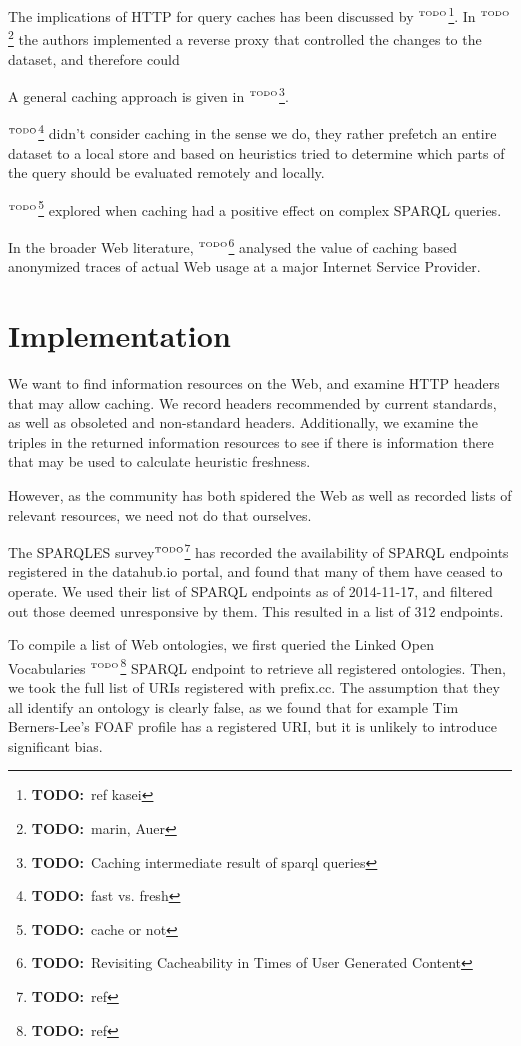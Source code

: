 \documentclass{article}
\newcommand{\todo}[1]{\ensuremath{^{\textrm{\tiny{TODO}\normalsize}}}\footnote{\textbf{TODO:}~#1}}
\begin{document}
The implications of HTTP for query caches has been discussed by
\todo{ref kasei}. In \todo{marin, Auer} the authors implemented a
reverse proxy that controlled the changes to the dataset, and
therefore could 

A general caching approach is given in \todo{Caching intermediate
  result of sparql queries}. 

\todo{fast vs. fresh} didn't consider caching in the sense we do, they
rather prefetch an entire dataset to a local store and based on
heuristics tried to determine which parts of the query should be
evaluated remotely and locally.

\todo{cache or not} explored when caching had a positive effect on
complex SPARQL queries.

In the broader Web literature, \todo{Revisiting Cacheability
in Times of User Generated Content} analysed the value of caching
based anonymized traces of actual Web usage at a major Internet
Service Provider.

\section{Implementation}

We want to find information resources on the Web, and examine HTTP
headers that may allow caching. We record headers recommended by
current standards, as well as obsoleted and non-standard
headers. Additionally, we examine the triples in the returned
information resources to see if there is information there that may be
used to calculate heuristic freshness.

However, as the community has both spidered the Web as well as
recorded lists of relevant resources, we need not do that ourselves. 

The SPARQLES survey\todo{ref} has recorded the availability of SPARQL
endpoints registered in the datahub.io portal, and found that many of
them have ceased to operate. We used their list of SPARQL endpoints as
of 2014-11-17, and filtered out those deemed unresponsive by
them. This resulted in a list of 312 endpoints.

To compile a list of Web ontologies, we first queried the Linked Open
Vocabularies \todo{ref} SPARQL endpoint to retrieve all registered
ontologies. Then, we took the full list of URIs registered with
prefix.cc. The assumption that they all identify an ontology is
clearly false, as we found that for example Tim Berners-Lee's FOAF
profile has a registered URI, but it is unlikely to introduce
significant bias.
\end{document}
